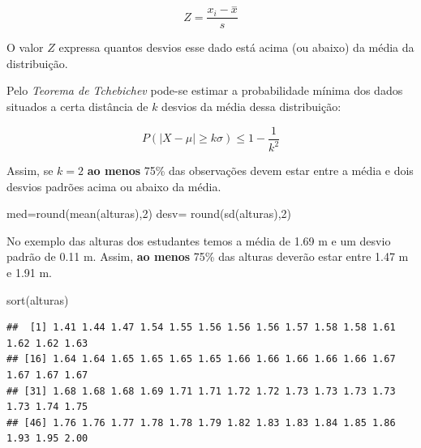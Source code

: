 \documentclass[
]{book}
\newenvironment{Shaded}{\begin{snugshade}}{\end{snugshade}}
\newcommand{\DecValTok}[1]{\textcolor[rgb]{0.00,0.00,0.81}{#1}}
\newcommand{\FunctionTok}[1]{\textcolor[rgb]{0.00,0.00,0.00}{#1}}
\newcommand{\NormalTok}[1]{#1}
\newcommand{\OtherTok}[1]{\textcolor[rgb]{0.56,0.35,0.01}{#1}}
\begin{document}
\hfill\break

\[
Z=\frac{x_{i} - \stackrel{-}{x}}{s}
\]

\hfill\break
O valor \(Z\) expressa quantos desvios esse dado está acima (ou abaixo) da média da distribuição.

\hfill\break

Pelo \emph{Teorema de Tchebichev} pode-se estimar a probabilidade mínima dos dados situados a certa distância de \(k\) desvios da média dessa distribuição:

\hfill\break

\[
P(|X-\mu|\ge k\sigma) \leq 1 - \frac{1}{k^{2}}
\]

\hfill\break

Assim, se \(k=2\) \textbf{ao menos} 75\% das observações devem estar entre a média e dois desvios padrões acima ou abaixo da média.

\hfill\break

\begin{Shaded}
\begin{Highlighting}[]
\NormalTok{med}\OtherTok{=}\FunctionTok{round}\NormalTok{(}\FunctionTok{mean}\NormalTok{(alturas),}\DecValTok{2}\NormalTok{)}
\NormalTok{desv}\OtherTok{=} \FunctionTok{round}\NormalTok{(}\FunctionTok{sd}\NormalTok{(alturas),}\DecValTok{2}\NormalTok{)}
\end{Highlighting}
\end{Shaded}

\hfill\break

No exemplo das alturas dos estudantes temos a média de 1.69 m e um desvio padrão de 0.11 m. Assim, \textbf{ao menos} 75\% das alturas deverão estar entre 1.47 m e 1.91 m.

\hfill\break

\begin{Shaded}
\begin{Highlighting}[]
\FunctionTok{sort}\NormalTok{(alturas)}
\end{Highlighting}
\end{Shaded}

\begin{verbatim}
##  [1] 1.41 1.44 1.47 1.54 1.55 1.56 1.56 1.56 1.57 1.58 1.58 1.61 1.62 1.62 1.63
## [16] 1.64 1.64 1.65 1.65 1.65 1.65 1.66 1.66 1.66 1.66 1.66 1.67 1.67 1.67 1.67
## [31] 1.68 1.68 1.68 1.69 1.71 1.71 1.72 1.72 1.73 1.73 1.73 1.73 1.73 1.74 1.75
## [46] 1.76 1.76 1.77 1.78 1.78 1.79 1.82 1.83 1.83 1.84 1.85 1.86 1.93 1.95 2.00
\end{verbatim}
\end{document}
